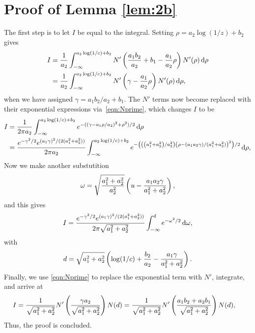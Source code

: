 \section{Proof of Lemma \ref{lem:2b}}
The first step is to let $I$ be equal to the integral. Setting $\rho = a_2\log\left( 1/z \right) + b_2$ gives
	\begin{align*}
		I &= \frac{1}{a_2}\int_{-\infty}^{a_2\log(1/c)+b_2} N'\left( \frac{a_1b_2}{a_2} + b_1 - \frac{a_1}{a_2}\rho \right)N'(\rho) \, \mathrm d \rho \\
		&=  \frac{1}{a_2}\int_{-\infty}^{a_2\log(1/c)+b_2} N'\left(\gamma - \frac{a_1}{a_2}\rho \right)N'(\rho) \, \mathrm d \rho,
	\end{align*}
when we have assigned $\gamma = a_1b_2/a_2 + b_1$. The $N'$ terms now become replaced with their exponential expressions via~\eqref{eqn:Nprime}, which changes $I$ to be
	\begin{align*}
		I &= \frac{1}{2\pi a_2}\int_{-\infty}^{a_2\log(1/c)+b_2} e^{-(\left(\gamma- a_1\rho/a_2\right)^2 + \rho^2)/2} \, \mathrm d \rho \\
		&= \frac{e^{-\gamma^2/2}e^{(a_1\gamma)^2/(2(a_1^2+a_2^2))}}{2\pi a_2}\int_{-\infty}^{a_2\log(1/c)+b_2} e^{-\left( \left(\left(a_1^2+a_2^2\right)/a_2^2\right)\left( \rho - (a_1a_2\gamma)/(a_1^2+a_2^2) \right)^2 \right)/2} \, \mathrm d \rho,
	\end{align*}
Now we make another substutition
	$$
		\omega = \sqrt{\frac{a_1^2+a_2^2}{a_2^2}}\left( u - \frac{a_1a_2\gamma}{a_1^2+a_2^2} \right),
	$$
and this gives
	$$
		I = \frac{e^{-\gamma^2/2}e^{(a_1\gamma)^2/(2(a_1^2+a_2^2))}}{2\pi \sqrt{a_1^2+a_2^2}}\int_{-\infty}^d e^{-\omega^2/2} \, \mathrm d\omega,
	$$
with
	$$
		d =  \sqrt{a_1^2+a_2^2}\left( \log(1/c) + \frac{b_2}{a_2} - \frac{a_1\gamma}{a_1^2+a_2^2} \right).
	$$
Finally, we use \eqref{eqn:Nprime} to replace the exponential term with $N'$, integrate, and arrive at
	\begin{align*}
		I &= \frac{1}{\sqrt{a_1^2 + a_2^2}}N'\left( \frac{\gamma a_2}{\sqrt{a_1^2+a_2^2}} \right)N(d) =\frac{1}{\sqrt{a_1^2 + a_2^2}}N'\left( \frac{a_1b_2 + a_2b_1}{\sqrt{a_1^2+a_2^2}} \right)N(d),
	\end{align*}
Thus, the proof is concluded.	


